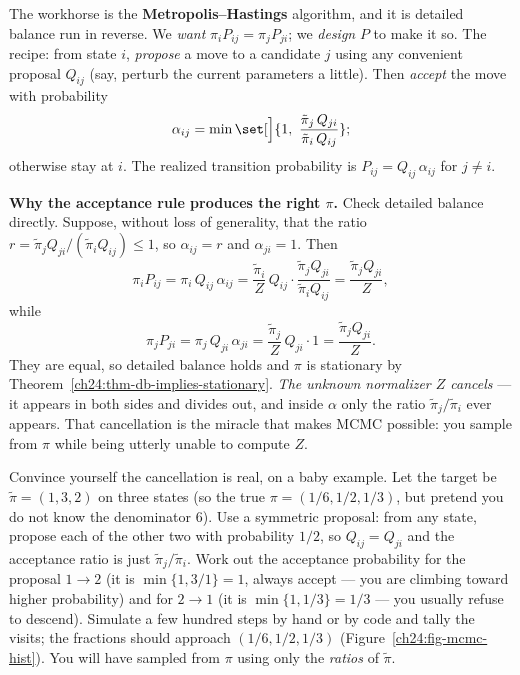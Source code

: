 The workhorse is the \textbf{Metropolis--Hastings} algorithm, and it is detailed
balance run in reverse. We \emph{want} $\pi_i P_{ij} = \pi_j P_{ji}$; we
\emph{design} $P$ to make it so. The recipe: from state $i$, \emph{propose} a move
to a candidate $j$ using any convenient proposal $Q_{ij}$ (say, perturb the
current parameters a little). Then \emph{accept} the move with probability
\[
  \alpha_{ij} = \min\set[\Big]{1,\ \frac{\tilde\pi_j\, Q_{ji}}{\tilde\pi_i\, Q_{ij}}};
\]
otherwise stay at $i$. The realized transition probability is
$P_{ij} = Q_{ij}\,\alpha_{ij}$ for $j\neq i$.

\begin{whybox}
\textbf{Why the acceptance rule produces the right $\pi$.} Check detailed balance
directly. Suppose, without loss of generality, that the ratio
$r = \tilde\pi_j Q_{ji} / (\tilde\pi_i Q_{ij}) \le 1$, so $\alpha_{ij} = r$ and
$\alpha_{ji} = 1$. Then
\[
  \pi_i P_{ij} = \pi_i\, Q_{ij}\,\alpha_{ij}
  = \frac{\tilde\pi_i}{Z}\, Q_{ij}\cdot \frac{\tilde\pi_j Q_{ji}}{\tilde\pi_i Q_{ij}}
  = \frac{\tilde\pi_j Q_{ji}}{Z},
\]
while
\[
  \pi_j P_{ji} = \pi_j\, Q_{ji}\,\alpha_{ji}
  = \frac{\tilde\pi_j}{Z}\, Q_{ji}\cdot 1 = \frac{\tilde\pi_j Q_{ji}}{Z}.
\]
They are equal, so detailed balance holds and $\pi$ is stationary by
Theorem~\ref{ch24:thm-db-implies-stationary}. \emph{The unknown normalizer $Z$
cancels} --- it appears in both sides and divides out, and inside $\alpha$ only the
ratio $\tilde\pi_j/\tilde\pi_i$ ever appears. That cancellation is the miracle that
makes MCMC possible: you sample from $\pi$ while being utterly unable to compute
$Z$.
\end{whybox}

\begin{labbox}
Convince yourself the cancellation is real, on a baby example. Let the target be
$\tilde\pi = (1, 3, 2)$ on three states (so the true $\pi = (1/6, 1/2, 1/3)$, but
pretend you do not know the denominator $6$). Use a symmetric proposal: from any
state, propose each of the other two with probability $1/2$, so $Q_{ij}=Q_{ji}$
and the acceptance ratio is just $\tilde\pi_j/\tilde\pi_i$. Work out the
acceptance probability for the proposal $1 \to 2$ (it is
$\min\{1, 3/1\} = 1$, always accept --- you are climbing toward higher
probability) and for $2 \to 1$ (it is $\min\{1, 1/3\} = 1/3$ --- you usually
refuse to descend). Simulate a few hundred steps by hand or by code and tally the
visits; the fractions should approach $(1/6, 1/2, 1/3)$ (Figure~\ref{ch24:fig-mcmc-hist}).
You will have sampled from $\pi$ using only the \emph{ratios} of $\tilde\pi$.
\end{labbox}

